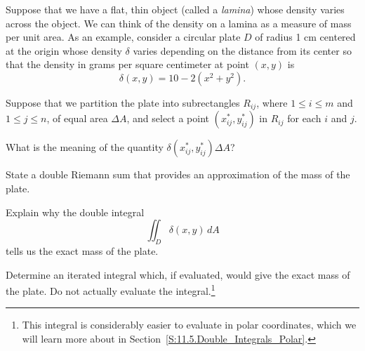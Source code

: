 \begin{pa} \label{PA:11.4} Suppose that we have a flat, thin object (called a \emph{lamina}) whose density varies across the object. We can think of the density on a lamina as a measure of mass per unit area. As an example, consider a circular plate $D$ of radius 1 cm centered at the origin whose density $\delta$ varies depending on the distance from its center so that  the density in grams per square centimeter at point $(x, y)$ is
\[\delta(x,y) = 10-2(x^2+y^2).\]

    \ba
    \item %
    Suppose that we partition the plate into subrectangles $R_{ij}$, where $1 \leq i \leq m$ and $1 \leq j \leq n$, of equal area $\Delta A$, and select a point $(x_{ij}^*,y_{ij}^*)$ in $R_{ij}$ for each $i$ and $j$.
    
    What is the meaning of the quantity $\delta(x_{ij}^*,y_{ij}^*) \Delta A$?
    

        \item State a double Riemann sum that provides an approximation of the mass of the plate.


        \item Explain why the double integral
    \[\iint_D \delta(x,y) \, dA\]
    tells us the exact mass of the plate.


        \item Determine an iterated integral which, if evaluated, would give the exact mass of the plate.  Do not actually evaluate the integral.\footnote{This integral is considerably easier to evaluate in polar coordinates, which we will learn more about in Section~\ref{S:11.5.Double_Integrals_Polar}.}


\ea

\end{pa}


